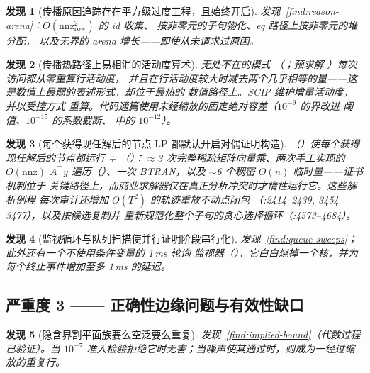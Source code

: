 \documentclass[11pt]{ctexart}
\newtheorem{finding}{发现}
\newcommand{\nnz}{\mathrm{nnz}}
\begin{document}
\begin{finding}[传播原因追踪存在平方级过度工程，且始终开启]
发现~\ref{find:reason-arena}：$O(\nnz_{\mathrm{row}}^2)$ 的 id 收集、
按非零元的子句物化、eq 路径上按非零元的堆分配，
以及无界的 arena 增长——即使从未请求过原因。
\end{finding}

\begin{finding}[传播热路径上易相消的活动度算术]
无处不在的模式 
（；预求解
）每次访问都从零重算行活动度，
\emph{并且}在行活动度较大时减去两个几乎相等的量——这是数值上最弱的表述形式，却位于最热的
数值路径上。SCIP 维护增量活动度，并以受控方式
重算。代码通篇使用未经缩放的固定绝对容差（$10^{-9}$ 的界改进
阈值、$10^{-15}$ 的系数截断、 中的 $10^{-12}$）。
\end{finding}

\begin{finding}[每个获得现任解后的节点 LP 都默认开启对偶证明构造]
（）使每个获得现任解后的节点都运行
 + 
（）：$\approx$3 次完整稀疏矩阵向量乘、两次手工实现的
$O(\nnz)$ $A^\top y$ 遍历（）、一次
BTRAN，以及 $\sim$6 个稠密 $O(n)$ 临时量——证书机制位于
关键路径上，而商业求解器仅在真正分析冲突时才惰性运行它。这些解析例程
每次审计还增加 $O(T^2)$ 的轨迹重放不动点闭包
（:2414--2439, 3454--3477），以及按候选复制并
重新规范化整个子句的贪心选择循环（:4573--4684）。
\end{finding}

\begin{finding}[监视循环与队列扫描使并行证明阶段串行化]
发现~\ref{find:queue-sweeps}；此外还有一个不使用条件变量的 1\,ms 轮询
监视器（），它白白烧掉一个核，并为每个终止事件增加至多
1\,ms 的延迟。
\end{finding}

\subsection{严重度 3 —— 正确性边缘问题与有效性缺口}

\begin{finding}[隐含界割平面族要么空泛要么重复]
发现~\ref{find:implied-bound}（代数过程已验证）。当
$10^{-7}$ 准入检验拒绝它时无害；当噪声使其通过时，则成为一经过缩放的重复行。
\end{finding}
\end{document}
